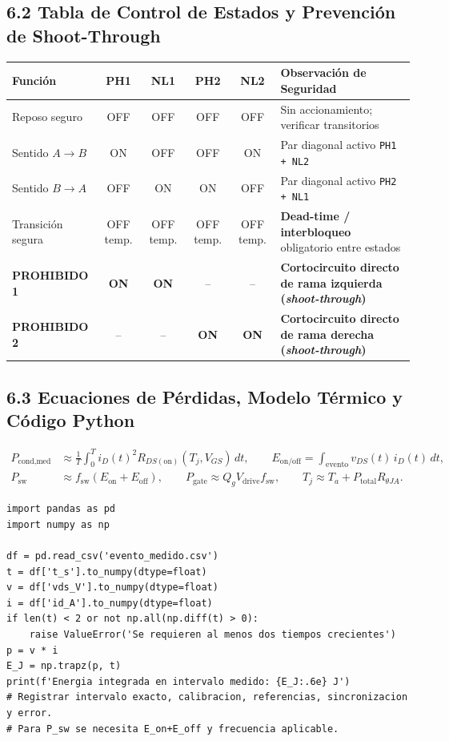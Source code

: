 \documentclass[10pt, a4paper, landscape]{article}
\begin{document}
\subsection*{6.2 Tabla de Control de Estados y Prevención de Shoot-Through}
\par\vspace{0.1cm}\noindent
\renewcommand{\arraystretch}{1.2}
\begin{tabularx}{\linewidth}{|l|c|c|c|c|>{\raggedright\arraybackslash}X|}
\hline
\rowcolor{ucbgray}
\textbf{Función} & \textbf{PH1} & \textbf{NL1} & \textbf{PH2} & \textbf{NL2} & \textbf{Observación de Seguridad} \\ \hline
Reposo seguro & OFF & OFF & OFF & OFF & Sin accionamiento; verificar transitorios \\ \hline
Sentido $A \rightarrow B$ & ON & OFF & OFF & ON & Par diagonal activo \texttt{PH1 + NL2} \\ \hline
Sentido $B \rightarrow A$ & OFF & ON & ON & OFF & Par diagonal activo \texttt{PH2 + NL1} \\ \hline
Transición segura & OFF temp. & OFF temp. & OFF temp. & OFF temp. & \textbf{Dead-time / interbloqueo} obligatorio entre estados \\ \hline
\textcolor{warnred}{\textbf{PROHIBIDO 1}} & \textcolor{warnred}{\textbf{ON}} & \textcolor{warnred}{\textbf{ON}} & -- & -- & \textbf{Cortocircuito directo de rama izquierda (\textit{shoot-through})} \\ \hline
\textcolor{warnred}{\textbf{PROHIBIDO 2}} & -- & -- & \textcolor{warnred}{\textbf{ON}} & \textcolor{warnred}{\textbf{ON}} & \textbf{Cortocircuito directo de rama derecha (\textit{shoot-through})} \\ \hline
\end{tabularx}

\subsection*{6.3 Ecuaciones de Pérdidas, Modelo Térmico y Código Python}
\begin{align}
    P_{\text{cond,med}} &\approx \frac{1}{T}\int_0^T i_D(t)^2 R_{DS(\text{on})}(T_j, V_{GS})\,dt, \qquad E_{\text{on/off}} = \int_{\text{evento}} v_{DS}(t)\,i_D(t)\,dt, \\
    P_{\text{sw}} &\approx f_{\text{sw}}\left(E_{\text{on}} + E_{\text{off}}\right), \qquad P_{\text{gate}} \approx Q_g V_{\text{drive}} f_{\text{sw}}, \qquad T_j \approx T_a + P_{\text{total}} R_{\theta JA}.
\end{align}

\begin{verbatim}
import pandas as pd
import numpy as np

df = pd.read_csv('evento_medido.csv')
t = df['t_s'].to_numpy(dtype=float)
v = df['vds_V'].to_numpy(dtype=float)
i = df['id_A'].to_numpy(dtype=float)
if len(t) < 2 or not np.all(np.diff(t) > 0):
    raise ValueError('Se requieren al menos dos tiempos crecientes')
p = v * i
E_J = np.trapz(p, t)
print(f'Energia integrada en intervalo medido: {E_J:.6e} J')
# Registrar intervalo exacto, calibracion, referencias, sincronizacion y error.
# Para P_sw se necesita E_on+E_off y frecuencia aplicable.
\end{verbatim}
\end{document}
